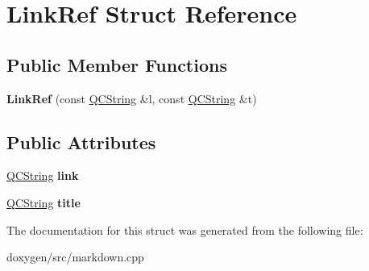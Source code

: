 \hypertarget{struct_link_ref}{}\section{Link\+Ref Struct Reference}
\label{struct_link_ref}
\subsection*{Public Member Functions}
\begin{DoxyCompactItemize}
\item 
\mbox{\label{struct_link_ref_a85268dc2649bc7716a29c36a664f7641}} 
{\bfseries Link\+Ref} (const \mbox{\hyperlink{class_q_c_string}{Q\+C\+String}} \&l, const \mbox{\hyperlink{class_q_c_string}{Q\+C\+String}} \&t)
\end{DoxyCompactItemize}
\subsection*{Public Attributes}
\begin{DoxyCompactItemize}
\item 
\mbox{\label{struct_link_ref_a7753b92d513129453ff61aef22e9e16f}} 
\mbox{\hyperlink{class_q_c_string}{Q\+C\+String}} {\bfseries link}
\item 
\mbox{\label{struct_link_ref_ae4e9faaf86404c38b23a6deaea875e33}} 
\mbox{\hyperlink{class_q_c_string}{Q\+C\+String}} {\bfseries title}
\end{DoxyCompactItemize}


The documentation for this struct was generated from the following file\+:\begin{DoxyCompactItemize}
\item 
doxygen/src/markdown.\+cpp\end{DoxyCompactItemize}

